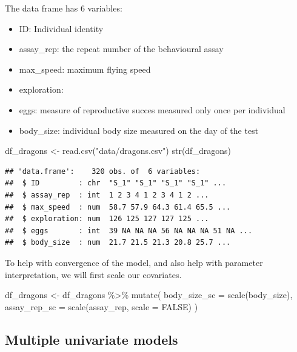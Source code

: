 \documentclass[
  12pt,
]{book}
\newenvironment{Shaded}{\begin{snugshade}}{\end{snugshade}}
\newcommand{\AttributeTok}[1]{\textcolor[rgb]{0.77,0.63,0.00}{#1}}
\newcommand{\ConstantTok}[1]{\textcolor[rgb]{0.00,0.00,0.00}{#1}}
\newcommand{\FunctionTok}[1]{\textcolor[rgb]{0.00,0.00,0.00}{#1}}
\newcommand{\NormalTok}[1]{#1}
\newcommand{\OtherTok}[1]{\textcolor[rgb]{0.56,0.35,0.01}{#1}}
\newcommand{\SpecialCharTok}[1]{\textcolor[rgb]{0.00,0.00,0.00}{#1}}
\newcommand{\StringTok}[1]{\textcolor[rgb]{0.31,0.60,0.02}{#1}}
\providecommand{\tightlist}{%
  \setlength{\itemsep}{0pt}\setlength{\parskip}{0pt}}
\begin{document}
The data frame has 6 variables:

\begin{itemize}
\tightlist
\item
  ID: Individual identity
\item
  assay\_rep: the repeat number of the behavioural assay
\item
  max\_speed: maximum flying speed
\item
  exploration:
\item
  eggs: measure of reproductive succes measured only once per individual
\item
  body\_size: individual body size measured on the day of the test
\end{itemize}

\begin{Shaded}
\begin{Highlighting}[]
\NormalTok{df\_dragons }\OtherTok{\textless{}{-}} \FunctionTok{read.csv}\NormalTok{(}\StringTok{"data/dragons.csv"}\NormalTok{)}
\FunctionTok{str}\NormalTok{(df\_dragons)}
\end{Highlighting}
\end{Shaded}

\begin{verbatim}
## 'data.frame':    320 obs. of  6 variables:
##  $ ID         : chr  "S_1" "S_1" "S_1" "S_1" ...
##  $ assay_rep  : int  1 2 3 4 1 2 3 4 1 2 ...
##  $ max_speed  : num  58.7 57.9 64.3 61.4 65.5 ...
##  $ exploration: num  126 125 127 127 125 ...
##  $ eggs       : int  39 NA NA NA 56 NA NA NA 51 NA ...
##  $ body_size  : num  21.7 21.5 21.3 20.8 25.7 ...
\end{verbatim}

To help with convergence of the model, and also help with parameter interpretation, we will first scale our covariates.

\begin{Shaded}
\begin{Highlighting}[]
\NormalTok{df\_dragons }\OtherTok{\textless{}{-}}\NormalTok{ df\_dragons }\SpecialCharTok{\%\textgreater{}\%}
  \FunctionTok{mutate}\NormalTok{(}
    \AttributeTok{body\_size\_sc =} \FunctionTok{scale}\NormalTok{(body\_size),}
    \AttributeTok{assay\_rep\_sc =} \FunctionTok{scale}\NormalTok{(assay\_rep, }\AttributeTok{scale =} \ConstantTok{FALSE}\NormalTok{)}
\NormalTok{  )}
\end{Highlighting}
\end{Shaded}

\hypertarget{multiple-univariate-models}{%
\subsection{Multiple univariate models}\label{multiple-univariate-models}}
\end{document}
